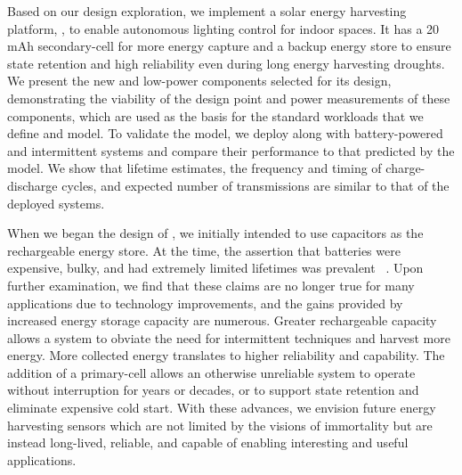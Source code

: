 Based on our design exploration, we implement a solar energy harvesting platform,
\name, to enable autonomous lighting control for indoor spaces. It has
a 20\,mAh secondary-cell for more energy capture
and a backup energy store to ensure
state retention and high reliability even during long energy harvesting droughts.
We present the new and low-power components selected for its
design, demonstrating the viability of the design point and
power measurements of
these components,
which are used as the basis for the standard workloads that we
define and model.  To validate the model,
we deploy \name along with battery-powered and intermittent systems and
compare their performance to that predicted by the model. We
show that lifetime estimates, the frequency and timing of charge-discharge
cycles, and expected number of transmissions are similar to that of the
deployed systems.

When we began the design of \name, we initially intended to use capacitors as
the rechargeable energy store.  At the time,
the assertion that batteries were expensive, bulky, and had
extremely limited lifetimes was prevalent
~\cite{hesterNew17, hesterTragedy15, hesterFlicker17, hesterTimely17, colinReconfigurable18, luciaIntermittent17}.
Upon further examination, we find that
these claims are no longer true for many applications due to technology
improvements, and the gains provided by increased energy storage
capacity are numerous.  Greater rechargeable capacity allows a system to obviate
the need for intermittent techniques and harvest more energy. More collected
energy translates to higher reliability and capability.  The addition of a
primary-cell allows an otherwise unreliable system to operate without
interruption for years or decades, or to support state retention and eliminate
expensive cold start.  With these advances, we envision future energy
harvesting sensors which are not limited by the visions of immortality but are
instead long-lived, reliable, and capable of enabling interesting and useful
applications.


